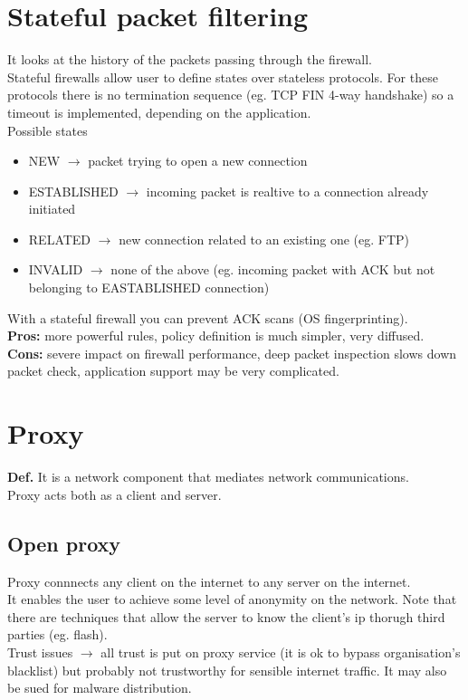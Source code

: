 \documentclass[10pt,a4paper]{book}
\begin{document}
\section{Stateful packet filtering}
It looks at the history of the packets passing through the firewall.\\
Stateful firewalls allow user to define states over stateless protocols. For these protocols there is no termination sequence (eg. TCP FIN 4-way handshake) so a timeout is implemented, depending on the application.\\
Possible states
\begin{itemize}
\item NEW $\to$ packet trying to open a new connection
\item ESTABLISHED $\to$ incoming packet is realtive to a connection already initiated
\item RELATED $\to$ new connection related to an existing one (eg. FTP)
\item INVALID $\to$ none of the above (eg. incoming packet with ACK  but not belonging to EASTABLISHED connection)
\end{itemize}
With a stateful firewall you can prevent ACK scans (OS fingerprinting).\\
\textbf{Pros:} more powerful rules, policy definition is much simpler, very diffused.\\
\textbf{Cons:} severe impact on firewall performance, deep packet inspection slows down packet check, application support may be very complicated.
\section{Proxy}
\textbf{Def.} It is a network component that mediates network communications.\\
Proxy acts both as a client and server.
\subsection{Open proxy}
Proxy connnects any client on the internet to any server on the internet.\\
It enables the user to achieve some level of anonymity on the network. Note that there are techniques that allow the server to know the client's ip thorugh third parties (eg. flash). \\
Trust issues $\to$ all trust is put on proxy service (it is ok to bypass organisation's blacklist) but probably not trustworthy for sensible internet traffic. It may also be sued for malware distribution.
\end{document}

